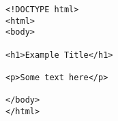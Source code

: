 \begin{lstlisting}[frame=single, basicstyle=\small]
<!DOCTYPE html>
<html>
<body>

<h1>Example Title</h1>

<p>Some text here</p>

</body>
</html>
\end{lstlisting}